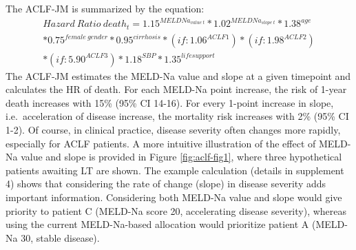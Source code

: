 \documentclass[11pt,english,]{book} %
\begin{document}
The ACLF-JM is summarized by the equation:
\begin{align*} 
{Hazard\ Ratio\ death}_t={1.15}^{{MELDNa}_{value\ t}}\ast{1.02}^{{MELDNa}_{slope\ t}}\ast{1.38}^{age}\\
\ast{0.75}^{female\ gender}\ast{0.95}^{cirrhosis}\ast\left(if:{1.06}^{ACLF1}\right)\ast\left(if:{1.98}^{ACLF2}\right)\\
\ast\left(if:{5.90}^{ACLF3}\right)\ast{1.18}^{SBP}\ast{1.35}^{life support}
\end{align*}
The ACLF-JM estimates the MELD-Na value and slope at a given timepoint and calculates the HR of death. For each MELD-Na point increase, the risk of 1-year death increases with 15\% (95\% CI 14-16). For every 1-point increase in slope, i.e.~acceleration of disease increase, the mortality risk increases with 2\% (95\% CI 1-2). Of course, in clinical practice, disease severity often changes more rapidly, especially for ACLF patients. A more intuitive illustration of the effect of MELD-Na value and slope is provided in Figure \ref{fig:aclf-fig1}, where three hypothetical patients awaiting LT are shown. The example calculation (details in supplement 4) shows that considering the rate of change (slope) in disease severity adds important information. Considering both MELD-Na value and slope would give priority to patient C (MELD-Na score 20, accelerating disease severity), whereas using the current MELD-Na-based allocation would prioritize patient A (MELD-Na 30, stable disease).
\end{document}
